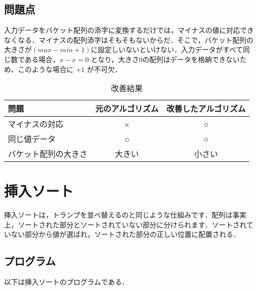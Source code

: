 \documentclass[a4j, titlepage]{jarticle}
\begin{document}
        \subsection{問題点}
            入力データをバケット配列の添字に変換するだけでは，マイナスの値に対応できなくなる．マイナスの配列添字はそもそもないからだ．そこで，バケット配列の大きさが$(max - min + 1)$に設定しいないといけない．入力データがすべて同じ数である場合，$ x - x = 0$ となり，大きさ0の配列はデータを格納できないため、このような場合に $+ 1$ が不可欠．
            \begin{table}[t]
                \caption{改善結果}
                \label{tab:bucket_problem}
                \begin{center}
                    \begin{tabular}{|l|c|c|}
                        \hline
                        問題 & 元のアルゴリズム & 改善したアルゴリズム\\ \hline
                        マイナスの対応 & × & ○\\ \hline
                        同じ値データ & ○ & ○\\ \hline
                        バケット配列の大きさ & 大きい & 小さい\\ \hline
                    \end{tabular}
                \end{center}
            \end{table}

    
    \section{挿入ソート}
        挿入ソートは，トランプを並べ替えるのと同じような仕組みです．配列は事実上，ソートされた部分とソートされていない部分に分けられます．ソートされていない部分から値が選ばれ，ソートされた部分の正しい位置に配置される．
    
        \subsection{プログラム}
            以下は挿入ソートのプログラムである．
            



       
\end{document}
